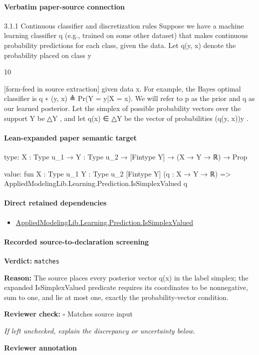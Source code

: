 \documentclass[10pt]{article}
\newcommand{\reviewerbox}{%
  \par\noindent\fbox{\parbox{0.96\linewidth}{\rule{0pt}{0.38in}}}\par
}
\newcommand{\reviewmatch}[1]{%
  \par\noindent\textbf{Reviewer check:} $\square$\; #1\par
  \noindent\emph{If left unchecked, explain the discrepancy or uncertainty below.}\par
}
\begin{document}
\paragraph{Verbatim paper-source connection}
\begin{ReviewVerbatim}
3.1.1    Continuous classifier and discretization rules
Suppose we have a machine learning classifier q (e.g., trained on some other dataset) that makes continuous
probability predictions for each class, given the data. Let q(y, x) denote the probability placed on class y



                                                       10

[form-feed in source extraction]
given data x. For example, the Bayes optimal classifier is
                                               q ∗ (y, x) ≜ Pr(Y = y|X = x).
We will refer to p as the prior and q as our learned posterior. Let the simplex of possible probability vectors
over the support Y be △Y , and let q(x) ∈ △Y be the vector of probabilities (q(y, x))y .
\end{ReviewVerbatim}



\paragraph{Lean-expanded paper semantic target}
\begin{ReviewVerbatim}
type:
{X : Type u_1} → {Y : Type u_2} → [Fintype Y] → (X → Y → ℝ) → Prop

value:
fun {X : Type u_1} {Y : Type u_2} [Fintype Y] (q : X → Y → ℝ) =>
  AppliedModelingLib.Learning.Prediction.IsSimplexValued q
\end{ReviewVerbatim}

\paragraph{Direct retained dependencies}
\begin{itemize}\raggedright
\item \hyperlink{governing-declaration-d1592e772e7c7e3d}{Applied\allowbreak{}Modeling\allowbreak{}Lib.\allowbreak{}Learning.\allowbreak{}Prediction.\allowbreak{}Is\allowbreak{}Simplex\allowbreak{}Valued}
\end{itemize}
\paragraph{Recorded source-to-declaration screening}
\textbf{Verdict:} \texttt{matches}
\\
{\raggedright
\textbf{Reason:} The source places every posterior vector q(x) in the label simplex;\allowbreak{} the expanded IsSimplexValued predicate requires its coordinates to be nonnegative, sum to one, and lie at most one, exactly the probability-\allowbreak{}vector condition.\allowbreak{}
\par}
\reviewmatch{Matches source input}
\noindent\textbf{Reviewer annotation}\par
\reviewerbox
\clearpage
\hypertarget{paper-prerequisite-e9ff5dcccf634407}{}
\end{document}
